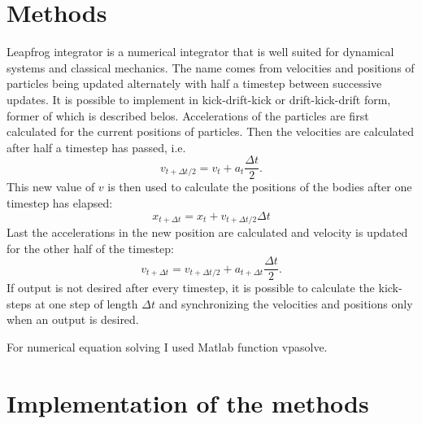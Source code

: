 \documentclass[12pt,a4paper,titlepage]{article}
\begin{document}
\section{Methods}
Leapfrog integrator is a numerical integrator that is well suited for dynamical systems and classical mechanics. The name comes from velocities and positions of particles being updated alternately with half a timestep between successive updates. It is possible to implement in kick-drift-kick or drift-kick-drift form, former of which is described belos. Accelerations of the particles are first calculated for the current positions of particles. Then the velocities are calculated after half a timestep has passed, i.e.
\begin{equation}
	v_{t+\Delta t/2} = v_t + a_t\frac{\Delta t}{2}.
\end{equation}
This new value of $v$ is then used to calculate the positions of the bodies after one timestep has elapsed:
\begin{equation}
	x_{t+\Delta t} = x_t + v_{t+\Delta t/2}\Delta t
\end{equation}
Last the accelerations in the new position are calculated and velocity is updated for the other half of the timestep:
\begin{equation}
	v_{t+\Delta t} = v_{t+\Delta t/2} + a_{t+\Delta t}\frac{\Delta t}{2}.
\end{equation}
If output is not desired after every timestep, it is possible to calculate the kick-steps at one step of length $\Delta t$ and synchronizing the velocities and positions only when an output is desired. \cite{dj, wikifrog}

For numerical equation solving I used Matlab function vpasolve.


\section{Implementation of the methods}
\end{document}
